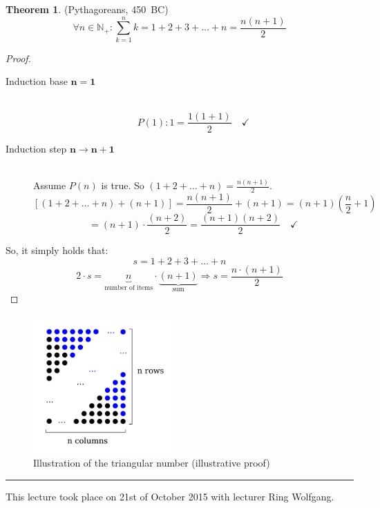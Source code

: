 \documentclass[a4paper,landscape,twocolumn]{article}
\theoremstyle{definition}
\newtheorem{theorem}{Theorem}
\newcommand\meta[3]{\hrule{} This #1 took place on #2 with lecturer #3.\par}
\begin{document}
\begin{theorem} (Pythagoreans, 450~BC)
  \[ \forall n \in \mathbb N_+: \sum_{k=1}^n k = 1 + 2 + 3 + \dots + n = \frac{n (n+1)}{2} \]
\end{theorem}
\begin{proof}
  \begin{description}
    \item[Induction base $\mathbf{n = 1}$] \hfill{} \\
      \[ P(1): 1 = \frac{1 (1+1)}{2} \quad\checkmark \]
    \item[Induction step $\mathbf{n \rightarrow n + 1}$] \hfill{} \\
      Assume $P(n)$ is true.
      So $(1 + 2 + \dots + n) = \frac{n (n+1)}{2}$.
      \[ \left[(1 + 2 + \dots + n) + (n + 1)\right] = \frac{n(n+1)}{2} + (n+1) = (n+1) \left(\frac n2 + 1\right) \]
      \[ = (n+1) \cdot \frac{(n+2)}{2} = \frac{(n+1)(n+2)}{2} \quad\checkmark \]
  \end{description}

  So, it simply holds that:
  \[ s = 1 + 2 + 3 + \dots + n \]
  \[ 2 \cdot s = \underbrace{n}_{\text{number of items}} \cdot \underbrace{(n + 1)}_{\text{sum}} \Rightarrow s = \frac{n \cdot (n + 1)}{2} \]
\end{proof}

\begin{figure}[!h]
  \begin{center}
    \includegraphics[width=200px]{img/triangular_number.pdf}
    \caption{Illustration of the triangular number (illustrative proof)}
  \end{center}
\end{figure}

\meta{lecture}{21st of October 2015}{Ring Wolfgang}
\end{document}
